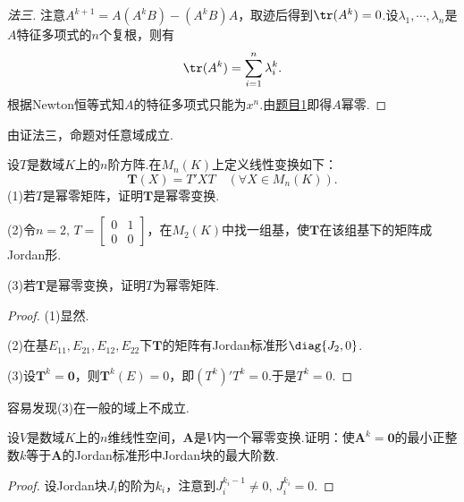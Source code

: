 \begin{proof}[法三]
	注意$A^{k+1}=A(A^kB)-(A^kB)A$，取迹后得到$\tr(A^k)=0$.设$\lambda_1,\cdots,\lambda_n$是$A$特征多项式的$n$个复根，则有
	\[
		\tr(A^k)=\sum_{i=1}^n\lambda_i^k.
	\]
	根据Newton恒等式知$A$的特征多项式只能为$x^n$.由\hyperlink{CharacteristicPolynomialOfNilpotent}{题目1}即得$A$幂零.
\end{proof}
\begin{note}
	由证法三，命题对任意域成立.
\end{note}
\begin{prob}[13]
	设$T$是数域$K$上的$n$阶方阵.在$M_n(K)$上定义线性变换如下：
	\[
		\bm T(X)=T'XT\quad(\forall X\in M_n(K)).
	\]
	(1)若$T$是幂零矩阵，证明$\bm T$是幂零变换.

	\noindent(2)令$n=2,\,T=\begin{bmatrix}
			0 & 1 \\
			0 & 0
		\end{bmatrix}$，在$M_2(K)$中找一组基，使$\bm T$在该组基下的矩阵成Jordan形.

	\noindent(3)若$\bm T$是幂零变换，证明$T$为幂零矩阵.
\end{prob}
\begin{proof}
	(1)显然.

	(2)在基$E_{11},E_{21},E_{12},E_{22}$下$\bm T$的矩阵有Jordan标准形$\diag{J_2,0}$.

	(3)设$\bm T^k=\bm 0$，则$\bm T^k(E)=0$，即$(T^k)'T^k=0$.于是$T^k=0$.
\end{proof}
\begin{note}
	容易发现(3)在一般的域上不成立.
\end{note}
\begin{prob}[14]
	设$V$是数域$K$上的$n$维线性空间，$\bm A$是$V$内一个幂零变换.证明：使$\bm A^k=\bm 0$的最小正整数$k$等于$\bm A$的Jordan标准形中Jordan块的最大阶数.
\end{prob}
\begin{proof}
	设Jordan块$J_i$的阶为$k_i$，注意到$J_i^{k_i-1}\ne0,\,J_i^{k_i}=0$.
\end{proof}
